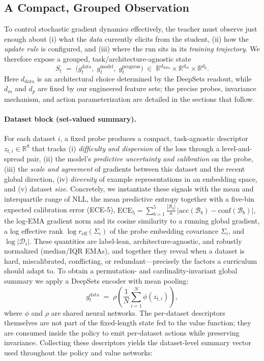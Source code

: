 \documentclass[11pt]{article}
\newcommand{\R}{\mathbb{R}}
\newcommand{\1}{\mathbf{1}}
\begin{document}
\subsection{A Compact, Grouped Observation}\label{sec:state}
To control stochastic gradient dynamics effectively, the teacher must observe just enough about (i) what the \emph{data} currently elicits from the student, (ii) how the \emph{update rule} is configured, and (iii) where the run sits in its \emph{training trajectory}. We therefore expose a grouped, task/architecture-agnostic state
\begin{equation}
\label{eq:grouped-state}
S_t \;=\; \big( g^{\text{data}}_t,\; g^{\text{model}}_t,\; g^{\text{progress}}_t \big)
\;\in\; \R^{d_{\text{data}}}\times\R^{d_m}\times\R^{d_p}.
\end{equation}
Here $d_{\text{data}}$ is an architectural choice determined by the DeepSets readout, while $d_m$ and $d_p$ are fixed by our engineered feature sets; the precise probes, invariance mechanism, and action parameterization are detailed in the sections that follow.

\paragraph{Dataset block (set-valued summary).}
For each dataset $i$, a fixed probe produces a compact, task-agnostic descriptor $z_{t,i}\in\R^{8}$ that tracks (i) \emph{difficulty and dispersion} of the loss through a level-and-spread pair, (ii) the model’s \emph{predictive uncertainty and calibration} on the probe, (iii) the \emph{scale and agreement} of gradients between this dataset and the recent global direction, (iv) \emph{diversity} of example representations in an embedding space, and (v) dataset \emph{size}. Concretely, we instantiate these signals with the mean and interquartile range of NLL, the mean predictive entropy together with a five-bin expected calibration error (ECE-5),
\(
\mathrm{ECE}_5=\sum_{b=1}^5 \tfrac{|\mathcal{B}_b|}{n}\,|\mathrm{acc}(\mathcal{B}_b)-\mathrm{conf}(\mathcal{B}_b)|,
\)
the log-EMA gradient norm and its cosine similarity to a running global gradient, a log effective rank $ \log r_{\mathrm{eff}}(\Sigma_i)$ of the probe embedding covariance $\Sigma_i$, and $\log|\mathcal{D}_i|$. These quantities are label-lean, architecture-agnostic, and robustly normalized (median/IQR EMAs), and together they reveal when a dataset is hard, miscalibrated, conflicting, or redundant—precisely the factors a curriculum should adapt to. To obtain a permutation- and cardinality-invariant global summary we apply a DeepSets encoder with mean pooling:
\begin{equation}
g^{\text{data}}_t \;=\; \rho\!\left(\frac{1}{N}\sum_{i=1}^N \phi(z_{t,i})\right),
\label{eq:deepsets-global}
\end{equation}
where $\phi$ and $\rho$ are shared neural networks. The per-dataset descriptors themselves are not part of the fixed-length state fed to the value function; they are consumed inside the policy to emit per-dataset actions while preserving invariance. Collecting these descriptors yields the dataset-level summary vector used throughout the policy and value networks:
\end{document}
